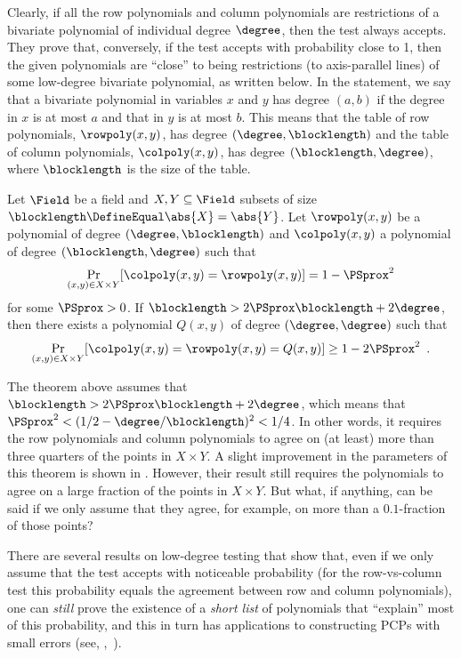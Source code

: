 \documentclass{toc}
\theoremstyle{plain}
\begin{document}
Clearly, if all the row polynomials and column polynomials are restrictions of a bivariate polynomial of individual degree $\degree$, then the test always accepts. They prove that, conversely, if the test accepts with probability close to 1, then the given polynomials are ``close'' to being restrictions (to axis-parallel lines) of some low-degree bivariate polynomial, as written below. In the statement, we say that a bivariate polynomial in variables $x$ and $y$ has degree $(a,b)$ if the degree in $x$ is at most $a$ and that in $y$ is at most $b$. This means that the table of row polynomials, $\rowpoly(x,y)$, has degree $(\degree, \blocklength)$ and the table of column polynomials, $\colpoly(x,y)$, has degree $(\blocklength, \degree)$, where $\blocklength$ is the size of the table.

\begin{theorem}
\label{thm:PS94}
Let $\Field$ be a field and $X,Y \subseteq \Field$ subsets of size $\blocklength \DefineEqual \abs{X} = \abs{Y}$.
Let $\rowpoly(x,y)$ be a polynomial of degree $(\degree,\blocklength)$ and $\colpoly(x,y)$ a polynomial of degree $(\blocklength,\degree)$ such that
\begin{equation*}
\Pr_{(x,y) \in X \times Y}
[\colpoly(x,y) = \rowpoly(x,y)]
= 1 - \PSprox^2
\end{equation*}
for some $\PSprox>0$.
If $\blocklength > 2 \PSprox \blocklength + 2\degree$, then there exists a polynomial $Q(x,y)$ of degree $(\degree,\degree)$ such that
\begin{equation*}
\Pr_{(x,y) \in X \times Y}[\colpoly(x,y) = \rowpoly(x,y) = Q(x,y)] \geq 1 - 2\PSprox^2 \enspace.
\end{equation*}
\end{theorem}

The theorem above assumes that $\blocklength > 2 \PSprox \blocklength + 2\degree$, which means that $\PSprox^2 < (1/2-\degree/\blocklength)^{2} < 1/4$. In other words, it requires the row polynomials and column polynomials to agree on (at least) more than three quarters of the points in $X \times Y$.
A slight improvement in the parameters of this theorem is shown in \cite{BenSassonCGT13}. However, their result still requires the polynomials to agree on a large fraction of the points in $X \times Y$.
But what, if anything, can be said if we only assume that they agree, for example, on more than a $0.1$-fraction of those points?

There are several results on low-degree testing that show that, even if we only assume that the test accepts with noticeable probability (for the row-vs-column test this probability equals the agreement between row and column polynomials), one can \emph{still} prove the existence of a \emph{short list} of polynomials that ``explain'' most of this probability, and this in turn has applications to constructing PCPs with small errors (see, \eg,~\cite{RazS97,AroraS03,MoshkovitzR08-ldt}).
\end{document}
